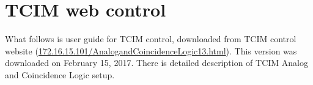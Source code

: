 \appendix
\chapter{TCIM web control}
\label{TCIMappend}
What follows is user guide for TCIM control, downloaded from TCIM control website (\url{172.16.15.101/AnalogandCoincidenceLogic13.html}). This version was downloaded on February 15, 2017. There is detailed description of TCIM Analog and Coincidence Logic setup.

